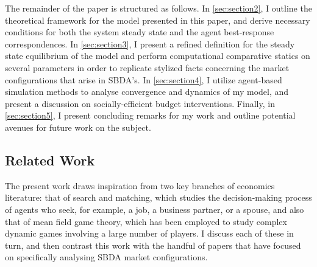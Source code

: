 The remainder of the paper is structured as follows. In \autoref{sec:section2}, I outline the theoretical framework for the model presented in this paper, and derive necessary conditions for both the system steady state and the agent best-response correspondences. In \autoref{sec:section3}, I present a refined definition for the steady state equilibrium of the model and perform computational comparative statics on several parameters in order to replicate stylized facts concerning the market configurations that arise in SBDA's. In \autoref{sec:section4}, I utilize agent-based simulation methods to analyse convergence and dynamics of my model, and present a discussion on socially-efficient budget interventions. Finally, in \autoref{sec:section5}, I present concluding remarks for my work and outline potential avenues for future work on the subject.

\subsection{Related Work}
The present work draws inspiration from two key branches of economics literature: that of search and matching, which studies the decision-making process of agents who seek, for example, a job, a business partner, or a spouse, and also that of mean field game theory, which has been employed to study complex dynamic games involving a large number of players. I discuss each of these in turn, and then contrast this work with the handful of papers that have focused on specifically analysing SBDA market configurations.

